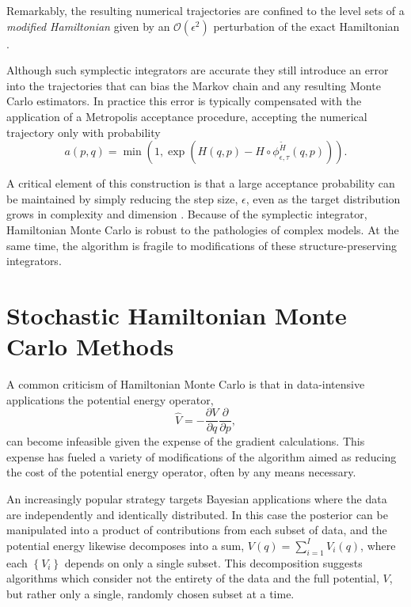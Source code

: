 \documentclass{article}
\begin{document}
%
Remarkably, the resulting numerical trajectories are confined to the level sets
of a \textit{modified Hamiltonian} given by an $\mathcal{O} \! \left( \epsilon^{2} \right)$
perturbation of the exact Hamiltonian \cite{HairerEtAl:2006, BetancourtEtAl:2014b}.

Although such symplectic integrators are accurate they still introduce an
error into the trajectories that can bias the Markov chain and any resulting
Monte Carlo estimators.  In practice this error is typically compensated with
the application of a Metropolis acceptance procedure, accepting the numerical
trajectory only with probability
%
\begin{equation*}
a (p, q) = \min \left(1, 
\exp \! \left( H (q, p) - H \circ \phi^{\widetilde{H}}_{\epsilon, \tau} (q, p) \right) \right).
\end{equation*}

A critical element of this construction is that a large acceptance probability can be 
maintained by simply reducing the step size, $\epsilon$, even as the target distribution 
grows in complexity and dimension \cite{BetancourtEtAl:2014b}.  Because of the
symplectic integrator, Hamiltonian Monte Carlo is robust to the pathologies of complex 
models.  At the same time, the algorithm is fragile to modifications of these
structure-preserving integrators.

\section{Stochastic Hamiltonian Monte Carlo Methods}

A common criticism of Hamiltonian Monte Carlo is that in data-intensive applications 
the potential energy operator,
%
\begin{equation*}
\hat{V} = - \frac{ \partial V }{ \partial q } \frac{ \partial }{ \partial p},
\end{equation*}
%
can become infeasible given the expense of the gradient calculations.  This expense
has fueled a variety of modifications of the algorithm aimed as reducing the cost of 
the potential energy operator, often by any means necessary.

An increasingly popular strategy targets Bayesian applications where the data are 
independently and identically distributed.  In this case the posterior can be manipulated
into a product of contributions from each subset of data, and the potential energy
likewise decomposes into a sum,
%
$V (q) = \sum_{i = 1}^{I} V_{i} (q)$,
%
where each $\left\{ V_{i} \right\}$ depends on only a single subset.  This decomposition 
suggests algorithms which consider not the entirety of the data and the full potential, $V$, 
but rather only a single, randomly chosen subset at a time.
\end{document}
